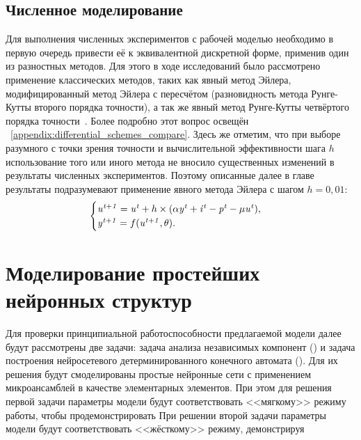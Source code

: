 \subsection{Численное моделирование}

Для выполнения численных экспериментов с рабочей моделью необходимо в первую очередь привести её к эквивалентной дискретной форме, применив один из разностных методов. Для этого в ходе исследований было рассмотрено применение классических методов, таких как явный метод Эйлера, модифицированный метод Эйлера с пересчётом (разновидность метода Рунге-Кутты второго порядка точности), а так же явный метод Рунге-Кутты четвёртого порядка точности~\cite{Hairer1990}. Более подробно этот вопрос освещён \inappendix~\ref{appendix:differential_schemes_compare}. Здесь же отметим, что при выборе разумного с точки зрения точности и вычислительной эффективности шага $h$ использование того или иного метода не вносило существенных изменений в результаты численных экспериментов. Поэтому описанные далее в главе результаты подразумевают применение явного метода Эйлера с шагом $h = 0,01$:
\begin{equation*}
    \begin{cases}
        \mathit{u^{t+1}} = \mathit{u^{t}} + h \times ( \alpha\mathit{y^{t}} + \mathit{i^{t}} - \mathit{p^{t}} - \mu\mathit{u^{t}} ), \\ 
        \mathit{y^{t+1}} = f(\mathit{u^{t+1}}, \theta).
    \end{cases}
\end{equation*}


\section{Моделирование простейших нейронных структур} \label{section:neuron_modeling}

Для проверки принципиальной работоспособности предлагаемой модели далее будут рассмотрены две задачи: задача анализа независимых компонент () и задача построения нейросетевого детерминированного конечного автомата (). Для их решения будут смоделированы простые нейронные сети с применением микроансамблей в качестве элементарных элементов. При этом для решения первой задачи параметры модели будут соответствовать <<мягкому>> режиму работы, чтобы продемонстрировать  При решении второй задачи параметры модели будут соответствовать <<жёсткому>> режиму, демонстрируя

